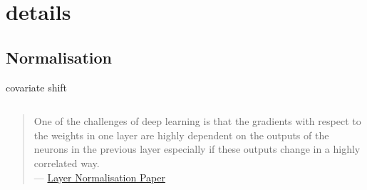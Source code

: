\documentclass[aspectratio=169,xcolor={dvipsnames,svgnames}]{beamer}
\begin{document}
\section{details}
\label{sec:appendix}
\subsection{Normalisation}
\label{sec:org70d8189}

\begin{frame}[label={sec:covariate-shift}]{covariate shift}
\begin{columns}
\begin{column}{0.45\columnwidth}
\begin{quote}
One of the challenges of deep learning is that the
gradients with respect to the weights in one layer are
highly dependent on the outputs of the neurons in the
previous layer especially if these outputs change in a
highly correlated way. \\[0pt]
--- \href{http://arxiv.org/abs/1607.06450}{Layer Normalisation Paper}
\end{quote}
\end{column}
\end{columns}
\end{frame}
\end{document}
